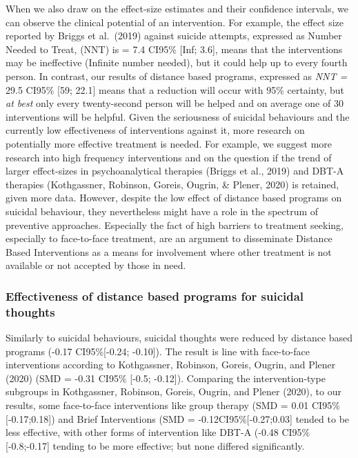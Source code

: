\documentclass[
  english,
  man]{apa6}
\begin{document}
When we also draw on the effect-size estimates and their confidence intervals, we can observe the clinical potential of an intervention. For example, the effect size reported by Briggs et al.~(2019) against suicide attempts, expressed as Number Needed to Treat, (NNT) is = 7.4 CI95\% {[}Inf; 3.6{]}, means that the interventions may be ineffective (Infinite number needed), but it could help up to every fourth person. In contrast, our results of distance based programs, expressed as \emph{NNT =} 29.5 CI95\% {[}59; 22.1{]} means that a reduction will occur with 95\% certainty, but \emph{at best} only every twenty-second person will be helped and on average one of 30 interventions will be helpful. Given the seriousness of suicidal behaviours and the currently low effectiveness of interventions against it, more research on potentially more effective treatment is needed. For example, we suggest more research into high frequency interventions and on the question if the trend of larger effect-sizes in psychoanalytical therapies (Briggs et al., 2019) and DBT-A therapies (Kothgassner, Robinson, Goreis, Ougrin, \& Plener, 2020) is retained, given more data. However, despite the low effect of distance based programs on suicidal behaviour, they nevertheless might have a role in the spectrum of preventive approaches. Especially the fact of high barriers to treatment seeking, especially to face-to-face treatment, are an argument to disseminate Distance Based Interventions as a means for involvement where other treatment is not available or not accepted by those in need.

\hypertarget{section}{%
\subsubsection{}\label{section}}

\hypertarget{effectiveness-of-distance-based-programs-for-suicidal-thoughts}{%
\subsubsection{Effectiveness of distance based programs for suicidal thoughts}\label{effectiveness-of-distance-based-programs-for-suicidal-thoughts}}

Similarly to suicidal behaviours, suicidal thoughts were reduced by distance based programs (-0.17 CI95\%{[}-0.24; -0.10{]}). The result is line with face-to-face interventions according to Kothgassner, Robinson, Goreis, Ougrin, and Plener (2020) (SMD = -0.31 CI95\% {[}-0.5; -0.12{]}). Comparing the intervention-type subgroups in Kothgassner, Robinson, Goreis, Ougrin, and Plener (2020), to our results, some face-to-face interventions like group therapy (SMD = 0.01 CI95\%{[}-0.17;0.18{]}) and Brief Interventions (SMD = -0.12CI95\%{[}-0.27;0.03{]} tended to be less effective, with other forms of intervention like DBT-A (-0.48 CI95\%{[}-0.8;-0.17{]} tending to be more effective; but none differed significantly.
\end{document}
